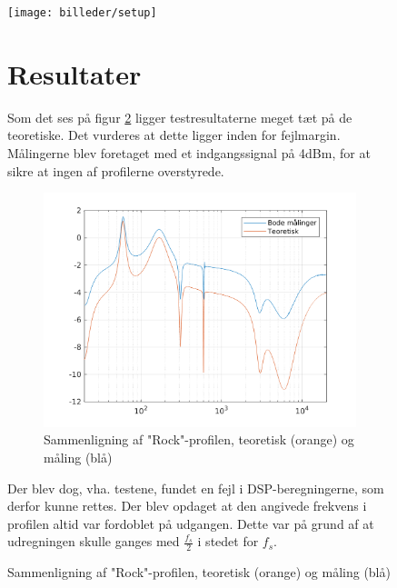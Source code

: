 \begin{figure}[h!]
	\centering
	\texttt{[image: billeder/setup]}
	\caption{Målingssetup med Bode 100}

\section{Resultater}
Som det ses på figur \ref{fig:rock_test} ligger testresultaterne meget tæt på de teoretiske. Det vurderes at dette ligger inden for fejlmargin. Målingerne blev foretaget med et indgangssignal på 4dBm, for at sikre at ingen af profilerne overstyrede.

\begin{figure}[h!]
	\centering
	\includegraphics[width=15cm]{billeder/rock_test}
	\caption{Sammenligning af "Rock"-profilen, teoretisk (orange) og måling (blå)}
	\label{fig:rock_test}
\end{figure}

Der blev dog, vha. testene, fundet en fejl i DSP-beregningerne, som derfor kunne rettes. Der blev opdaget at den angivede frekvens i profilen altid var fordoblet på udgangen. Dette var på grund af at udregningen skulle ganges med $\frac{f_s}{2}$ i stedet for $f_s$.

\end{figure}

